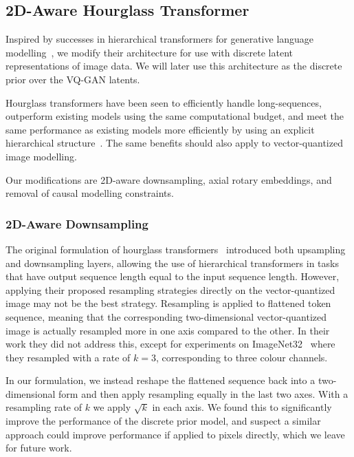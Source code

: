 \subsection{2D-Aware Hourglass Transformer}
Inspired by successes in hierarchical transformers for generative language
modelling~\cite{nawrot2021hierarchical}, we modify their architecture for use
with discrete latent representations of image data. We will later use this
architecture as the discrete prior over the VQ-GAN latents. 

Hourglass transformers have been seen to efficiently handle long-sequences,
outperform existing models using the same computational budget, and meet the
same performance as existing models more efficiently by using an explicit
hierarchical structure~\cite{nawrot2021hierarchical}. The same benefits should
also apply to vector-quantized image modelling.

Our modifications are 2D-aware downsampling, axial rotary embeddings, and
removal of causal modelling constraints.

\subsubsection*{2D-Aware Downsampling}

The original formulation of hourglass transformers~\cite{nawrot2021hierarchical}
introduced both upsampling and downsampling layers, allowing the use of
hierarchical transformers in tasks that have output sequence length equal to the
input sequence length. However, applying their proposed resampling strategies directly on
the vector-quantized image may not be the best strategy. Resampling is applied
to flattened token sequence, meaning that the corresponding two-dimensional
vector-quantized image is actually resampled more in one axis compared to the
other. In their work they did not address this, except for experiments on
ImageNet32~\cite{russakovsky2015imagenet} where they resampled with a rate of
$k=3$, corresponding to three colour channels.

In our formulation, we instead reshape the flattened sequence back into a
two-dimensional form and then apply resampling equally in the last two axes.
With a resampling rate of $k$ we apply $\sqrt{k}$ in each axis. We found this to
significantly improve the performance of the discrete prior model, and suspect a
similar approach could improve performance if applied to pixels directly, which
we leave for future work.

